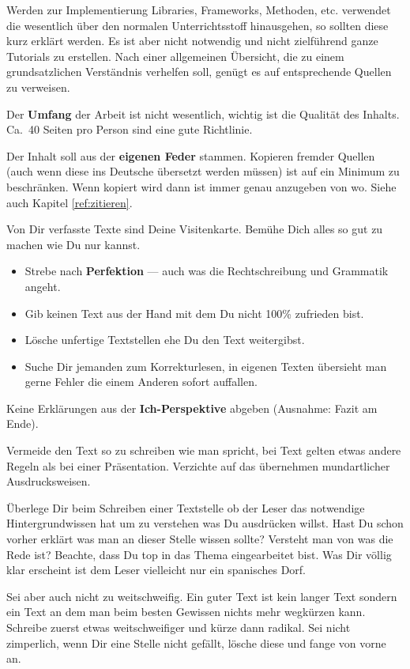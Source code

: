 Werden zur Implementierung Libraries, Frameworks, Methoden, etc. verwendet die wesentlich über den normalen Unterrichtsstoff hinausgehen, so sollten diese kurz erklärt werden.
Es ist aber nicht notwendig und nicht zielführend ganze Tutorials zu erstellen.
Nach einer allgemeinen Übersicht, die zu einem grundsatzlichen Verständnis verhelfen soll, genügt es auf entsprechende Quellen zu verweisen.

Der \textbf{Umfang} der Arbeit ist nicht wesentlich, wichtig ist die Qualität des Inhalts.
Ca.\ 40 Seiten pro Person sind eine gute Richtlinie.

Der Inhalt soll aus der \textbf{eigenen Feder} stammen. 
Kopieren fremder Quellen (auch wenn diese ins Deutsche übersetzt werden müssen) ist auf ein Minimum zu beschränken. 
Wenn kopiert wird dann ist immer genau anzugeben von wo. 
Siehe auch Kapitel \ref{ref:zitieren}.

Von Dir verfasste Texte sind Deine Visitenkarte. 
Bemühe Dich alles so gut zu machen wie Du nur kannst.
\begin{itemize}
\item
Strebe nach \textbf{Perfektion} --- auch was die Rechtschreibung und Grammatik angeht.
\item
Gib keinen Text aus der Hand mit dem Du nicht 100\% zufrieden bist.
\item
Lösche unfertige Textstellen ehe Du den Text weitergibst.
\item
Suche Dir jemanden zum Korrekturlesen, in eigenen Texten übersieht man gerne Fehler die einem Anderen sofort auffallen.
\end{itemize}

Keine Erklärungen aus der \textbf{Ich-Perspektive} abgeben (Ausnahme: Fazit am Ende).

Vermeide den Text so zu schreiben wie man spricht, bei Text gelten etwas andere Regeln als bei einer Präsentation.
Verzichte auf das übernehmen mundartlicher Ausdrucksweisen.

Überlege Dir beim Schreiben einer Textstelle ob der Leser das notwendige Hintergrundwissen hat um zu verstehen was Du ausdrücken willst.
Hast Du schon vorher erklärt was man an dieser Stelle wissen sollte?
Versteht man von was die Rede ist?
Beachte, dass Du top in das Thema eingearbeitet bist. 
Was Dir völlig klar erscheint ist dem Leser vielleicht nur ein spanisches Dorf.

Sei aber auch nicht zu weitschweifig. 
Ein guter Text ist kein langer Text sondern ein Text an dem man beim besten Gewissen nichts mehr wegkürzen kann.
Schreibe zuerst etwas weitschweifiger und kürze dann radikal.
Sei nicht zimperlich, wenn Dir eine Stelle nicht gefällt, lösche diese und fange von vorne an.

